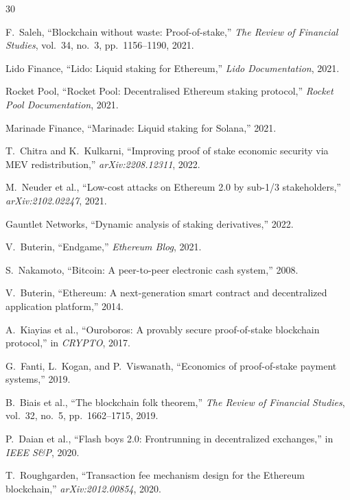 
\begin{thebibliography}{30}

F.~Saleh, ``Blockchain without waste: Proof-of-stake,'' \emph{The Review of Financial Studies}, vol.~34, no.~3, pp.~1156--1190, 2021.

Lido Finance, ``Lido: Liquid staking for Ethereum,'' \emph{Lido Documentation}, 2021.

Rocket Pool, ``Rocket Pool: Decentralised Ethereum staking protocol,'' \emph{Rocket Pool Documentation}, 2021.

Marinade Finance, ``Marinade: Liquid staking for Solana,'' 2021.

T.~Chitra and K.~Kulkarni, ``Improving proof of stake economic security via MEV redistribution,'' \emph{arXiv:2208.12311}, 2022.

M.~Neuder et al., ``Low-cost attacks on Ethereum 2.0 by sub-1/3 stakeholders,'' \emph{arXiv:2102.02247}, 2021.

Gauntlet Networks, ``Dynamic analysis of staking derivatives,'' 2022.

V.~Buterin, ``Endgame,'' \emph{Ethereum Blog}, 2021.

S.~Nakamoto, ``Bitcoin: A peer-to-peer electronic cash system,'' 2008.

V.~Buterin, ``Ethereum: A next-generation smart contract and decentralized application platform,'' 2014.

A.~Kiayias et al., ``Ouroboros: A provably secure proof-of-stake blockchain protocol,'' in \emph{CRYPTO}, 2017.

G.~Fanti, L.~Kogan, and P.~Viswanath, ``Economics of proof-of-stake payment systems,'' 2019.

B.~Biais et al., ``The blockchain folk theorem,'' \emph{The Review of Financial Studies}, vol.~32, no.~5, pp.~1662--1715, 2019.

P.~Daian et al., ``Flash boys 2.0: Frontrunning in decentralized exchanges,'' in \emph{IEEE S\&P}, 2020.

T.~Roughgarden, ``Transaction fee mechanism design for the Ethereum blockchain,'' \emph{arXiv:2012.00854}, 2020.


\end{thebibliography}
